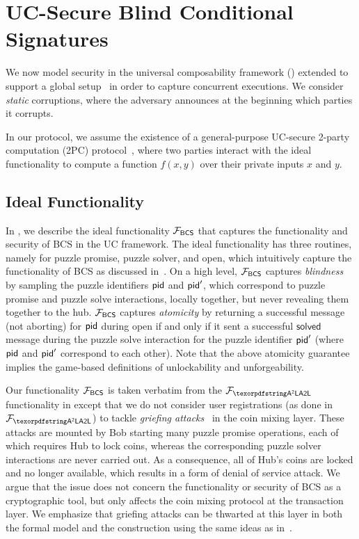 \section{UC-Secure Blind Conditional Signatures}\label{sec:uc-bcs}

We now model security in the universal composability framework () extended to support a global setup~\cite{TCC:CDPW07} in order to capture concurrent executions. 
We consider \emph{static} corruptions, where the adversary announces at the beginning which parties it corrupts.

In our protocol, we assume the existence of a general-purpose UC-secure 2-party computation (2PC) protocol~\cite{C:HorKat07,STOC:CLOS02}, where two parties interact with the ideal functionality to compute a function $f(x,y)$ over their private inputs $x$ and $y$. 



\subsection{Ideal Functionality}
In , we describe the ideal functionality $\mathcal{F}_{\mathsf{BCS}}$ that captures the functionality and security of BCS in the UC framework.
The ideal functionality has three routines, namely for puzzle promise, puzzle solver, and open, which intuitively capture the functionality of BCS as discussed in~. On a high level, $\mathcal{F}_{\mathsf{BCS}}$ captures \emph{blindness} by sampling the puzzle identifiers $\mathsf{pid}$ and $\mathsf{pid}'$, which correspond to puzzle promise and puzzle solve interactions, locally together, but never revealing them together to the hub. $\mathcal{F}_{\mathsf{BCS}}$ captures \emph{atomicity} by returning a successful message (not aborting) for $\mathsf{pid}$ during open if and only if it sent a successful $\mathsf{solved}$ message during the puzzle solve interaction for the puzzle identifier $\mathsf{pid}'$ (where $\mathsf{pid}$ and $\mathsf{pid}'$ correspond to each other). Note that the above atomicity guarantee implies the game-based definitions of unlockability and unforgeability.

Our functionality $\mathcal{F}_{\mathsf{BCS}}$ is taken verbatim from the $\F_{\AAL}$ functionality in \cite{SP:TaiMorMaf21} except that we do not consider user registrations (as done in $\F_{\AAL}$) to tackle \emph{griefing attacks}~\cite{griefing} in the coin mixing layer. These attacks are mounted by Bob starting many puzzle promise operations, each of which
requires Hub to lock coins, whereas the corresponding puzzle solver interactions are never carried out. As
a consequence, all of Hub's coins are locked and no longer
available, which results in a form of denial of service attack. 
We argue that the issue does not concern the functionality or security of BCS as a  cryptographic tool, but only affects the coin mixing protocol at the transaction layer.
We emphasize that griefing attacks can be thwarted at this layer in both the formal model and the construction using the same ideas as in~\cite{SP:TaiMorMaf21}.

